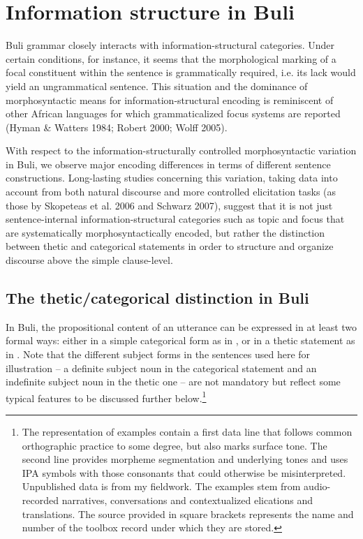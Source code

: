 \documentclass[output=paper]{langsci/langscibook}
\begin{document}
\section{ Information structure in Buli}

Buli grammar closely interacts with information-structural categories. Under certain conditions, for instance, it seems that the morphological marking of a focal constituent within the sentence is grammatically required, i.e. its lack would yield an ungrammatical sentence. This situation and the dominance of morphosyntactic means for information-structural encoding is reminiscent of other African languages for which grammaticalized focus systems are reported (Hyman \& Watters 1984; Robert 2000; Wolff 2005). 

With respect to the information-structurally controlled morphosyntactic variation in Buli, we observe major encoding differences in terms of different sentence constructions. Long-lasting studies concerning this variation, taking data into account from both natural discourse and more controlled elicitation tasks (as those by Skopeteas et al. 2006 and Schwarz 2007), suggest that it is not just sentence-internal information-structural categories such as topic and focus that are systematically morphosyntactically encoded, but rather the distinction between thetic and categorical statements in order to structure and organize discourse above the simple clause-level. 

\subsection{The thetic/categorical distinction in Buli}

In Buli, the propositional content of an utterance can be expressed in at least two formal ways: either in a simple categorical form as in , or in a thetic statement as in . Note that the different subject forms in the sentences used here for illustration – a definite subject noun in the categorical statement and an indefinite subject noun in the thetic one – are not mandatory but reflect some typical features to be discussed further below.\footnote{ The representation of examples contain a first data line that follows common orthographic practice to some degree, but also marks surface tone. The second line provides morpheme segmentation and underlying tones and uses IPA symbols with those consonants that could otherwise be misinterpreted. Unpublished data is from my fieldwork. The examples stem from audio-recorded narratives, conversations and contextualized elications and translations. The source provided in square brackets represents the name and number of the toolbox record under which they are stored.} 
 
\end{document}
